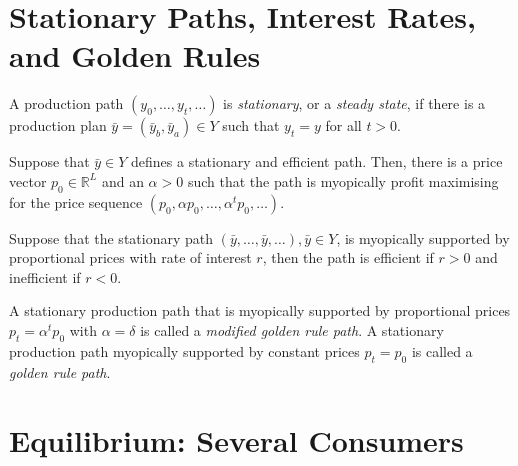 \section{Stationary Paths, Interest Rates, and Golden Rules}

\begin{defn}
    A production path $(y_0, \dots, y_t, \dots)$ is \emph{stationary}, or a \emph{steady state}, if there is a production plan $\bar{y} = (\bar{y}_b, \bar{y}_a) \in Y$ such that $y_t = y$ for all $t > 0$.
\end{defn}

\begin{prop}
    Suppose that $\bar{y} \in Y$ defines a stationary and efficient path. Then, there is a price vector $p_0 \in \mathbb{R}^{L}$ and an $\alpha > 0$ such that the path is myopically profit maximising for the price sequence $(p_0, \alpha p_0, \dots, \alpha^t p_0, \dots)$.
\end{prop}

\begin{prop}
    Suppose that the stationary path $(\bar{y}, \dots, \bar{y}, \dots), \bar{y} \in Y$, is myopically supported by proportional prices with rate of interest $r$, then the path is efficient if $r > 0$ and inefficient if $r < 0$.
\end{prop}

\begin{defn}
    A stationary production path that is myopically supported by proportional prices $p_t = \alpha^t p_0$ with $\alpha = \delta$ is called a \emph{modified golden rule path}. A stationary production path myopically supported by constant prices $p_t = p_0$ is called a \emph{golden rule path}.
\end{defn}

\addtocounter{section}{1}

\section{Equilibrium: Several Consumers}

